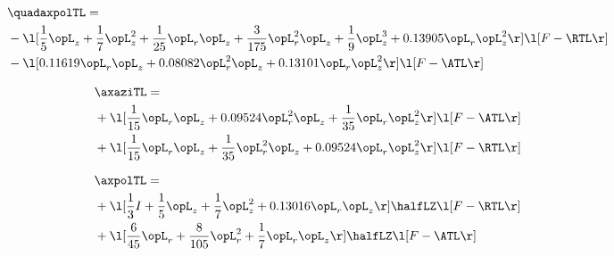 \begin{alignat}{2} 
\label{eq:quadaxpolTL_2} 
& \quadaxpolTL = \\ 
& - \l[ \frac{1}{5} \opL_z + \frac{1}{7} \opL_z^{2} + \frac{1}{25} \opL_r \opL_z + \frac{3}{175} \opL_r^{2} \opL_z + \frac{1}{9} \opL_z^{3} +  0.13905 \opL_r \opL_z^{2}  \r] \l[ F - \RTL \r] \nonumber \\ 
& - \l[  0.11619 \opL_r \opL_z +  0.08082 \opL_r^{2} \opL_z +  0.13101 \opL_r \opL_z^{2}  \r] \l[ F - \ATL \r] \nonumber \\ 
\end{alignat} 


\begin{alignat}{2} 
\label{eq:linaxaziTL_2} 
& \axaziTL = \\ 
& + \l[ \frac{1}{15} \opL_r \opL_z +  0.09524 \opL_r^{2} \opL_z + \frac{1}{35} \opL_r \opL_z^{2}  \r] \l[ F - \ATL \r] \nonumber \\ 
& + \l[ \frac{1}{15} \opL_r \opL_z + \frac{1}{35} \opL_r^{2} \opL_z +  0.09524 \opL_r \opL_z^{2}  \r] \l[ F - \RTL \r] \nonumber \\ 
\end{alignat} 


\begin{alignat}{2} 
\label{eq:linaxpolTL_2} 
& \axpolTL = \\ 
& + \l[ \frac{1}{3} I + \frac{1}{5} \opL_z + \frac{1}{7} \opL_z^{2} +  0.13016 \opL_r \opL_z  \r] \halfLZ \l[ F - \RTL \r] \nonumber \\ 
& + \l[ \frac{6}{45} \opL_r + \frac{8}{105} \opL_r^{2} + \frac{1}{7} \opL_r \opL_z  \r] \halfLZ \l[ F - \ATL \r] \nonumber \\ 
\end{alignat} 


